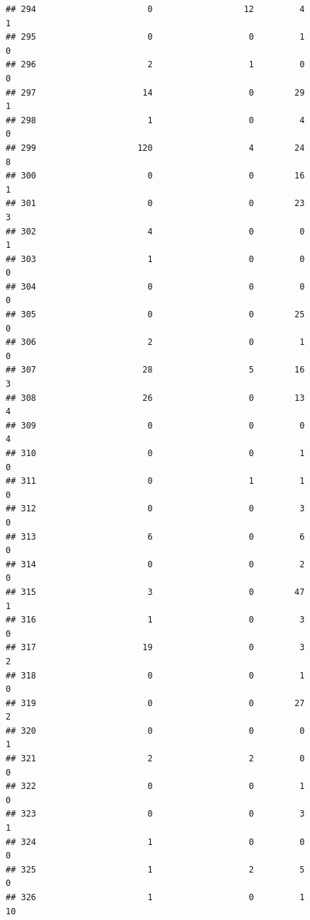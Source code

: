 \documentclass[
]{article}
\begin{document}
\begin{verbatim}
## 294                      0                  12         4                  1
## 295                      0                   0         1                  0
## 296                      2                   1         0                  0
## 297                     14                   0        29                  1
## 298                      1                   0         4                  0
## 299                    120                   4        24                  8
## 300                      0                   0        16                  1
## 301                      0                   0        23                  3
## 302                      4                   0         0                  1
## 303                      1                   0         0                  0
## 304                      0                   0         0                  0
## 305                      0                   0        25                  0
## 306                      2                   0         1                  0
## 307                     28                   5        16                  3
## 308                     26                   0        13                  4
## 309                      0                   0         0                  4
## 310                      0                   0         1                  0
## 311                      0                   1         1                  0
## 312                      0                   0         3                  0
## 313                      6                   0         6                  0
## 314                      0                   0         2                  0
## 315                      3                   0        47                  1
## 316                      1                   0         3                  0
## 317                     19                   0         3                  2
## 318                      0                   0         1                  0
## 319                      0                   0        27                  2
## 320                      0                   0         0                  1
## 321                      2                   2         0                  0
## 322                      0                   0         1                  0
## 323                      0                   0         3                  1
## 324                      1                   0         0                  0
## 325                      1                   2         5                  0
## 326                      1                   0         1                 10

\end{verbatim}
\end{document}
